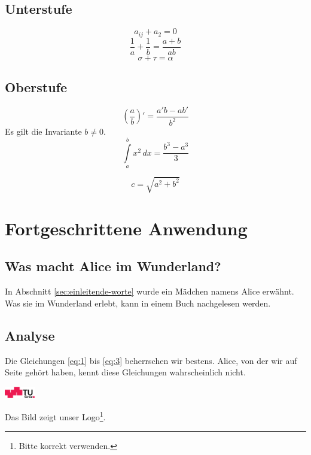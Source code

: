 \documentclass[11pt]{scrartcl}
\begin{document}
\subsection{Unterstufe}
\label{sec:unterstufe}
\begin{equation*}
 	a_{ij} + a_2 = 0
\end{equation*}
\begin{equation*}
  	\frac{1}{a} + \frac{1}{b} = \frac{a+b}{ab}
\end{equation*}
\begin{equation*}
  	\sigma + \tau = \alpha
\end{equation*}
 
\subsection{Oberstufe} 
\label{sec:oberstufe}
\begin{equation}
 	\label{eq:1}
 	\left( \frac{a}{b} \right)' = \frac{a'b-ab'}{b^{2}}
\end{equation} 
Es gilt die Invariante $b \neq 0$.
\begin{equation}
 	\label{eq:2}
 	\int\limits_{a}^{b} x^{2} \, dx = \frac{ b^{3} - a^{3} }{3}
\end{equation}

\begin{equation}
	\label{eq:3}
	c = \sqrt{ a^{2} + b^{2} }
\end{equation}

\section{Fortgeschrittene Anwendung}
\label{sec:fortg-anwend}
 
\subsection{Was macht Alice im Wunderland?}
\label{sec:was-macht-alice}
In Abschnitt \ref{sec:einleitende-worte} wurde ein Mädchen namens
Alice erwähnt. Was sie im Wunderland erlebt, kann in einem Buch
nachgelesen werden.
 
\subsection{Analyse}
\label{sec:analyse}
Die Gleichungen \eqref{eq:1} bis \eqref{eq:3} beherrschen wir bestens.
Alice, von der wir auf Seite \pageref{sec:einleitende-worte} gehört
haben, kennt diese Gleichungen wahrscheinlich nicht.

\begin{center}
 	\includegraphics[width=0.1\textwidth]{TUG-logo}
\end{center}
Das Bild zeigt unser Logo\footnote{Bitte korrekt verwenden.}.
	
\end{document}
